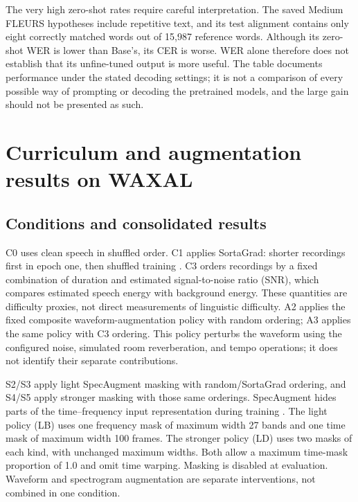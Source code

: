 \documentclass[12pt,a4paper]{report}
\begin{document}
The very high zero-shot rates require careful interpretation. The saved
Medium FLEURS hypotheses include repetitive text, and its test alignment
contains only eight correctly matched words out of 15,987 reference words.
Although its zero-shot WER is lower than Base's, its CER is worse. WER alone
therefore does not establish that its unfine-tuned output is more useful.
The table documents performance under the stated decoding settings; it is
not a comparison of every possible way of prompting or decoding the pretrained
models, and the large gain should not be presented as such.

\section{Curriculum and augmentation results on WAXAL}
\label{sec:waxal}

\subsection{Conditions and consolidated results}

C0 uses clean speech in shuffled order. C1 applies SortaGrad: shorter
recordings first in epoch one, then shuffled training \citep{Amodei2016}.
C3 orders recordings by a fixed combination of duration and estimated
signal-to-noise ratio (SNR), which compares estimated speech energy with
background energy. These quantities are difficulty proxies, not direct
measurements of linguistic difficulty. A2 applies the fixed composite
waveform-augmentation policy with random ordering; A3 applies the same
policy with C3 ordering. This policy perturbs the waveform using the
configured noise, simulated room reverberation, and tempo operations; it does not identify
their separate contributions.

S2/S3 apply light SpecAugment masking with random/SortaGrad ordering, and
S4/S5 apply stronger masking with those same orderings. SpecAugment hides
parts of the time--frequency input representation during training
\citep{Park2019}. The light policy (LB) uses one frequency mask of maximum
width 27 bands and one time mask of maximum width 100 frames. The stronger
policy (LD) uses two masks of each kind, with unchanged maximum widths.
Both allow a maximum time-mask proportion of 1.0 and omit time warping.
Masking is disabled at evaluation. Waveform and spectrogram augmentation
are separate interventions, not combined in one condition.
\end{document}
